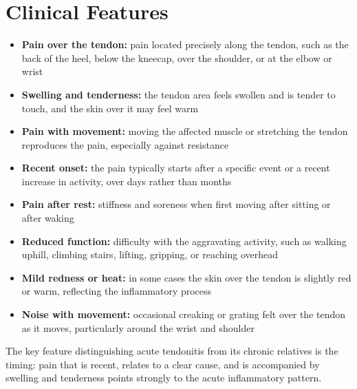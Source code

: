\section*{Clinical Features}
\begin{itemize}
    \item \textbf{Pain over the tendon:} pain located precisely along the tendon, such as the back of the heel, below the kneecap, over the shoulder, or at the elbow or wrist
    \item \textbf{Swelling and tenderness:} the tendon area feels swollen and is tender to touch, and the skin over it may feel warm
    \item \textbf{Pain with movement:} moving the affected muscle or stretching the tendon reproduces the pain, especially against resistance
    \item \textbf{Recent onset:} the pain typically starts after a specific event or a recent increase in activity, over days rather than months
    \item \textbf{Pain after rest:} stiffness and soreness when first moving after sitting or after waking
    \item \textbf{Reduced function:} difficulty with the aggravating activity, such as walking uphill, climbing stairs, lifting, gripping, or reaching overhead
    \item \textbf{Mild redness or heat:} in some cases the skin over the tendon is slightly red or warm, reflecting the inflammatory process
    \item \textbf{Noise with movement:} occasional creaking or grating felt over the tendon as it moves, particularly around the wrist and shoulder
\end{itemize}

The key feature distinguishing acute tendonitis from its chronic relatives is the timing: pain that is recent, relates to a clear cause, and is accompanied by swelling and tenderness points strongly to the acute inflammatory pattern.

